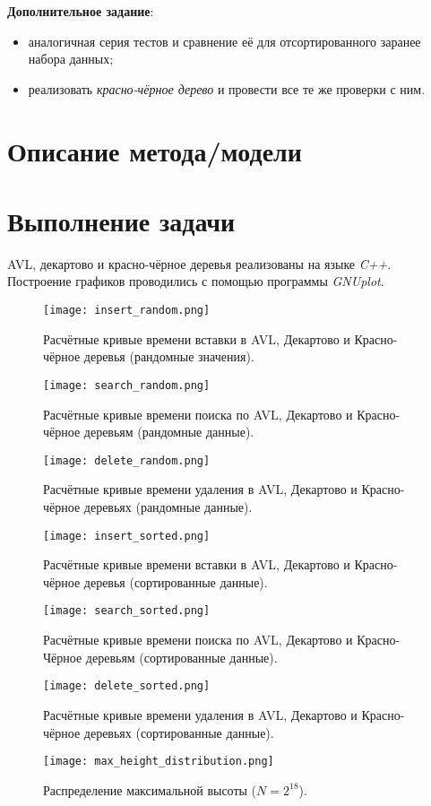 \documentclass[12pt, a4paper]{report}
\begin{document}
	\par
	\textbf{Дополнительное задание}:
	\begin{itemize}
		\item аналогичная серия тестов и сравнение её для отсортированного заранее набора данных;
		\item реализовать \textit{красно-чёрное дерево} и провести все те же проверки с ним.
	\end{itemize}
	
	\newpage

	\section*{Описание метода/модели}
	\large

	\newpage

	\section*{Выполнение задачи}
	AVL, декартово и красно-чёрное деревья реализованы на языке \textit{C++}. Построение графиков проводились с помощью программы \textit{GNUplot}.

	\newpage
	\vfill

	\begin{figure}[h]
		\centering
		\texttt{[image: insert\_random.png]}
		\caption{Расчётные кривые времени вставки в AVL, Декартово и Красно-чёрное деревья (рандомные значения).}
	\end{figure}
	\begin{figure}[h]
		\centering
		\texttt{[image: search\_random.png]}
		\caption{Расчётные кривые времени поиска по AVL, Декартово и Красно-чёрное деревьям (рандомные данные).}
	\end{figure}
	\begin{figure}[h]
		\centering
		\texttt{[image: delete\_random.png]}
		\caption{Расчётные кривые времени удаления в AVL, Декартово и Красно-чёрное деревьях (рандомные данные).}
	\end{figure}
	\begin{figure}[h]
		\centering
		\texttt{[image: insert\_sorted.png]}
		\caption{Расчётные кривые времени вставки в AVL, Декартово и Красно-чёрное деревья (сортированные данные).}
	\end{figure}
	\begin{figure}[h]
		\centering
		\texttt{[image: search\_sorted.png]}
		\caption{Расчётные кривые времени поиска по AVL, Декартово и Красно-Чёрное деревьям (сортированные данные).}
	\end{figure}
	\begin{figure}[h]
		\centering
		\texttt{[image: delete\_sorted.png]}
		\caption{Расчётные кривые времени удаления в AVL, Декартово и Красно-чёрное деревьях (сортированные данные).}
	\end{figure}	
	\begin{figure}[h]
		\centering
		\texttt{[image: max\_height\_distribution.png]}
		\caption{Распределение максимальной высоты ($N = 2^{18}$).}
	\end{figure}	
\end{document}
